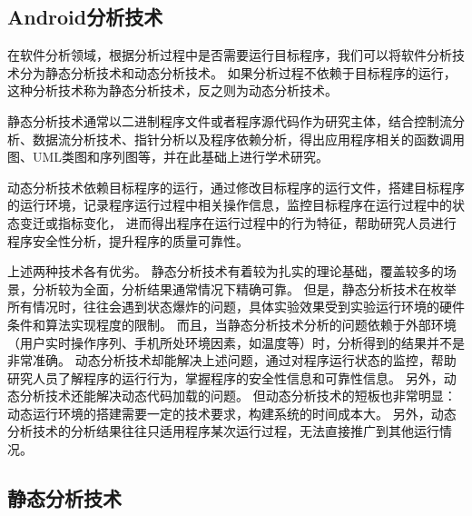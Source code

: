 \subsection{Android分析技术}

在软件分析领域，根据分析过程中是否需要运行目标程序，我们可以将软件分析技术分为静态分析技术和动态分析技术。
如果分析过程不依赖于目标程序的运行，这种分析技术称为静态分析技术，反之则为动态分析技术。

静态分析技术通常以二进制程序文件或者程序源代码作为研究主体，结合控制流分析、数据流分析技术、指针分析以及程序依赖分析，得出应用程序相关的函数调用图、UML类图和序列图等，并在此基础上进行学术研究。

动态分析技术依赖目标程序的运行，通过修改目标程序的运行文件，搭建目标程序的运行环境，记录程序运行过程中相关操作信息，监控目标程序在运行过程中的状态变迁或指标变化，
进而得出程序在运行过程中的行为特征，帮助研究人员进行程序安全性分析，提升程序的质量可靠性。



上述两种技术各有优劣。
静态分析技术有着较为扎实的理论基础，覆盖较多的场景，分析较为全面，分析结果通常情况下精确可靠。
但是，静态分析技术在枚举所有情况时，往往会遇到状态爆炸的问题，具体实验效果受到实验运行环境的硬件条件和算法实现程度的限制。
而且，当静态分析技术分析的问题依赖于外部环境（用户实时操作序列、手机所处环境因素，如温度等）时，分析得到的结果并不是非常准确。
动态分析技术却能解决上述问题，通过对程序运行状态的监控，帮助研究人员了解程序的运行行为，掌握程序的安全性信息和可靠性信息。
另外，动态分析技术还能解决动态代码加载的问题。
但动态分析技术的短板也非常明显：动态运行环境的搭建需要一定的技术要求，构建系统的时间成本大。
另外，动态分析技术的分析结果往往只适用程序某次运行过程，无法直接推广到其他运行情况。%




\subsection{静态分析技术}


